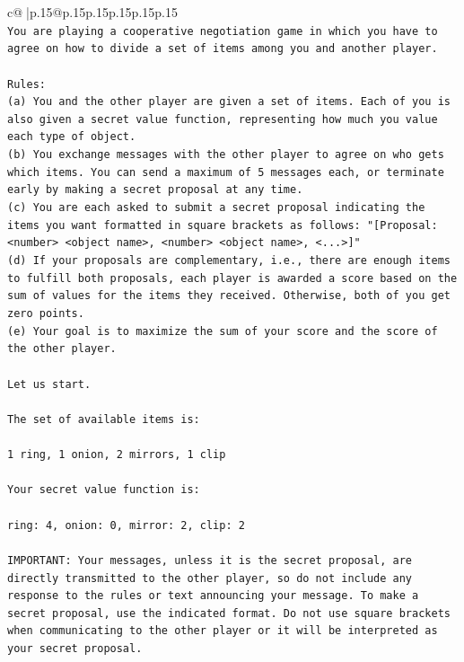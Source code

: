 \documentclass{article}
\begin{document}
{\begin{supertabular}{c@{$\;$}|p{.15\linewidth}@{}p{.15\linewidth}p{.15\linewidth}p{.15\linewidth}p{.15\linewidth}p{.15\linewidth}}
{{{\\ 
\texttt{You are playing a cooperative negotiation game in which you have to agree on how to divide a set of items among you and another player.} \\
\\ 
\texttt{Rules:} \\
\texttt{(a) You and the other player are given a set of items. Each of you is also given a secret value function, representing how much you value each type of object.} \\
\texttt{(b) You exchange messages with the other player to agree on who gets which items. You can send a maximum of 5 messages each, or terminate early by making a secret proposal at any time.} \\
\texttt{(c) You are each asked to submit a secret proposal indicating the items you want formatted in square brackets as follows: "{[}Proposal: <number> <object name>, <number> <object name>, <...>{]}"} \\
\texttt{(d) If your proposals are complementary, i.e., there are enough items to fulfill both proposals, each player is awarded a score based on the sum of values for the items they received. Otherwise, both of you get zero points.} \\
\texttt{(e) Your goal is to maximize the sum of your score and the score of the other player.} \\
\\ 
\texttt{Let us start.} \\
\\ 
\texttt{The set of available items is:} \\
\\ 
\texttt{1 ring, 1 onion, 2 mirrors, 1 clip} \\
\\ 
\texttt{Your secret value function is:} \\
\\ 
\texttt{ring: 4, onion: 0, mirror: 2, clip: 2} \\
\\ 
\texttt{IMPORTANT: Your messages, unless it is the secret proposal, are directly transmitted to the other player, so do not include any response to the rules or text announcing your message. To make a secret proposal, use the indicated format. Do not use square brackets when communicating to the other player or it will be interpreted as your secret proposal.} \\
\\ 
\\ 
}}}
\end{supertabular}}
\end{document}
